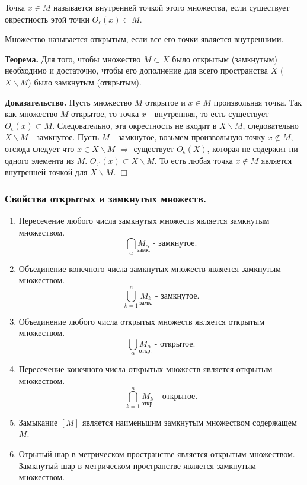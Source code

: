 \documentclass[14pt,a4paper]{extarticle}
\theoremstyle{definition}
\theoremstyle{remark}
\newcommand{\be}{\begin{enumerate}}
\newcommand{\ee}{\end{enumerate}}
\renewcommand{\[}{\begin{dmath*}[compact]}
\renewcommand{\]}{\end{dmath*}}
\newcommand{\tth}[1][]{\textbf{Теорема#1.}}
\newcommand{\btev}[1][]{\textbf{Доказательство#1.}
}
\newcommand{\etev}{$\Box$}
\begin{document}
Точка $x \in M$ называется внутренней точкой этого множества, если существует
окрестность этой точки $O_\epsilon(x)\subset M$.

Множество называется открытым, если все его точки является внутренними.

\tth[] Для того, чтобы множество $M\subset X$ было открытым (замкнутым)
необходимо и достаточно, чтобы его дополнение для всего пространства $X$
($X\backslash M$) было замкнутым (открытым).

\btev[] Пусть множество $M$ открытое и $x \in M$ произвольная точка.
Так как множество $M$ открытое, то точка $x$ - внутренняя, то есть существует
$O_\epsilon(x)\subset M$. Следовательно, эта окрестность не входит в
$X \backslash M$, следовательно $X \backslash M$ - замкнутое.
Пусть $M$ - замкнутое, возьмем произвольную точку $x \notin M$, отсюда следует
что $x\in X\backslash M$ $\Rightarrow$ существует $O_{\epsilon}(X)$, которая
не содержит ни одного элемента из $M$. $O_{\epsilon'}(x)\subset X\backslash M$.
То есть любая точка $x \notin M$ является внутренней точкой для
$X \backslash M$. \etev

\subsubsection{Свойства открытых и замкнутых множеств.}

\be
  \item Пересечение любого числа замкнутых множеств является замкнутым множеством.
  \[ \bigcap _\alpha \underset {\text{замк.}} {M_\alpha}\text{ - замкнутое.} \]

  \item Объединение конечного числа замкнутых множеств является замкнутым множеством.
  \[ \bigcup _{k = 1}^n \underset {\text{замк.}} {M_k}\text{ - замкнутое.} \]

  \item Объединение любого числа открытых множеств является открытым множеством.
  \[ \bigcup _{\alpha} \underset {\text{откр.}} {M_\alpha}\text{ - открытое.} \]

  \item Пересечение конечного числа открытых множеств является открытым множеством.
  \[ \bigcap _{k = 1}^n \underset {\text{откр.}} {M_k}\text{ - открытое.} \]

  \item Замыкание $[M]$ является наименьшим замкнутым множеством содержащем $M$.

  \item Отрытый шар в метрическом пространстве является открытым множеством.
  Замкнутый шар в метрическом пространстве является замкнутым множеством.
\ee
\end{document}
